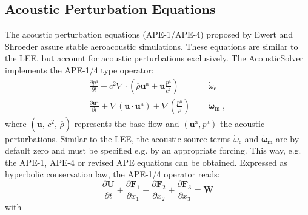 \subsection{Acoustic Perturbation Equations}
The acoustic perturbation equations (APE-1/APE-4) proposed by Ewert and Shroeder \cite{EwSc03} assure stable aeroacoustic simulations.
These equations are similar to the LEE, but account for acoustic perturbations exclusively.
The AcousticSolver implements the APE-1/4 type operator:
\begin{subequations}
    \begin{align}
        \frac{\partial p^\mathrm{a}}{\partial t} 
        + \overline{c^2} \nabla \cdot \left( \overline{\rho} \boldsymbol{u}^\mathrm{a} 
        + \overline{\boldsymbol{u}} \frac{p^\mathrm{a}}{\overline{c^2}} \right) 
        &= \dot{\omega}_\mathrm{c}
        \\
        \frac{\partial \boldsymbol{u}^\mathrm{a}}{\partial t} 
        + \nabla \left(\overline{\boldsymbol{u}} \cdot \boldsymbol{u}^\mathrm{a} \right) 
        + \nabla \left(\frac{p^\mathrm{a}}{\overline{\rho}}\right) 
        &= \dot{\boldsymbol{\omega}}_\mathrm{m}
        \;,
    \end{align}
\end{subequations}
where $(\overline{\boldsymbol{u}},\,\overline{c^2},\, \overline{\rho})$ represents the base flow and $(\boldsymbol{u}^\mathrm{a},p^\mathrm{a})$ the acoustic perturbations.
Similar to the LEE, the acoustic source terms $\dot{\omega}_\mathrm{c}$ and $\dot{\boldsymbol{\omega}}_\mathrm{m}$ are by default zero and must be specified e.g. by an appropriate forcing.
This way, e.g. the APE-1, APE-4 \cite{EwSc03} or revised APE equations \cite{Ge14} can be obtained.
Expressed as hyperbolic conservation law, the APE-1/4 operator reads:
\begin{equation}
\frac{\partial  \boldsymbol{U}}{\partial t}
+ \frac{\partial \boldsymbol{F}_1}{\partial x_1}
+ \frac{\partial \boldsymbol{F}_2}{\partial x_2}
+ \frac{\partial \boldsymbol{F}_3}{\partial x_3}
= \boldsymbol{W}
\end{equation}
with
